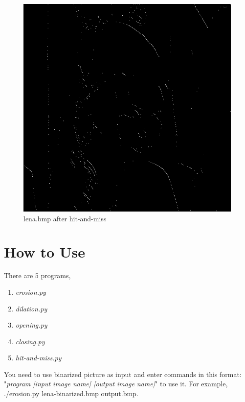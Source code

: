 \documentclass[14pt,a4paper]{extarticle}
\newcommand{\inlinecode}[1]{\colorbox{backcolour}{\color{darkgray}#1}}
\begin{document}
\begin{figure}[H]
\centering
\includegraphics[scale=0.6]{lena-hit.bmp}
\caption{lena.bmp after hit-and-miss}
\label{fig:lena-hit.bmp}
\end{figure}

\section*{How to Use}
There are 5 programs,
\begin{enumerate}
    \item \textit{erosion.py}
    \item \textit{dilation.py}
    \item \textit{opening.py}
    \item \textit{closing.py}
    \item \textit{hit-and-miss.py}
\end{enumerate}
You need to use binarized picture as input and enter commands in this format: "\textit{program [input image name] [output image name]}" to use it. For example, \inlinecode{./erosion.py lena-binarized.bmp output.bmp}.
\end{document}
